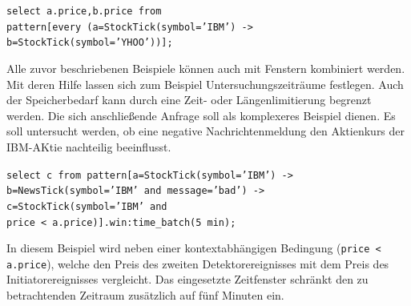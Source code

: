 \documentclass{acm_proc_article-sp}
\begin{document}
\texttt{\texttt{select a.price,b.price from\\pattern[every (a=StockTick(symbol='IBM') ->\\
        b=StockTick(symbol='YHOO'))];}}

\begin{table}[ht]
    \caption{\textit{Regular Consumption Mode}}
    \label{table:recent}\vspace{0.2cm}
\end{table}

Alle zuvor beschriebenen Beispiele können auch mit Fenstern kombiniert werden. Mit deren 
Hilfe lassen sich zum Beispiel Untersuchungszeiträume festlegen. Auch der Speicherbedarf 
kann durch eine Zeit- oder Längenlimitierung begrenzt werden. Die sich anschließende 
Anfrage soll als komplexeres Beispiel dienen. Es soll untersucht werden, ob eine negative 
Nachrichtenmeldung den Aktienkurs der IBM-AKtie nachteilig beeinflusst.

\texttt{select c from pattern[a=StockTick(symbol='IBM') ->\\
    b=NewsTick(symbol='IBM' and message='bad') ->\\
    c=StockTick(symbol='IBM' and\\ price < a.price)].win:time\_batch(5 min);}

In diesem Beispiel wird neben einer kontextabhängigen Bedingung (\texttt{price < 
a.price}), welche den Preis des zweiten Detektorereignisses mit dem Preis des 
Initiatorereignisses vergleicht. Das eingesetzte Zeitfenster schränkt den zu 
betrachtenden Zeitraum zusätzlich auf fünf Minuten ein.
\end{document}
